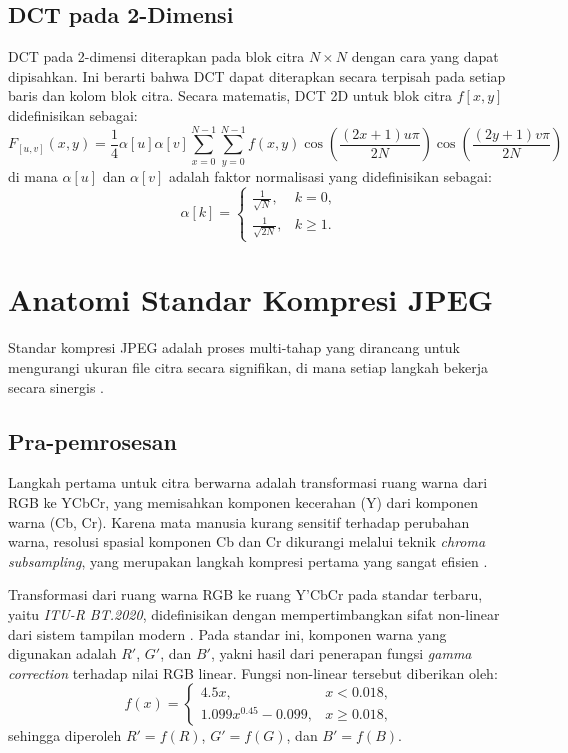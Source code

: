 \documentclass[a4paper]{article}
\begin{document}
\subsection{DCT pada 2-Dimensi}
DCT pada 2-dimensi diterapkan pada blok citra $N \times N$ dengan cara yang dapat dipisahkan. Ini berarti bahwa DCT dapat diterapkan secara terpisah pada setiap baris dan kolom blok citra. Secara matematis, DCT 2D untuk blok citra $f[x,y]$ didefinisikan sebagai:
\begin{equation} \label{eq:dct_2d}
  F_{[u,v]}(x,y) = \frac{1}{4} \alpha[u] \alpha[v] \sum_{x=0}^{N-1} \sum_{y=0}^{N-1} f(x,y) \cos\left(\frac{(2x+1)u\pi}{2N}\right) \cos\left(\frac{(2y+1)v\pi}{2N}\right)
\end{equation}
di mana $\alpha[u]$ dan $\alpha[v]$ adalah faktor normalisasi yang didefinisikan sebagai:
\begin{equation}
  \alpha[k] =
  \begin{cases}
    \frac{1}{\sqrt{N}},  & k = 0,   \\[4pt]
    \frac{1}{\sqrt{2N}}, & k \ge 1.
  \end{cases}
\end{equation}

\section{Anatomi Standar Kompresi JPEG}
Standar kompresi JPEG adalah proses multi-tahap yang dirancang untuk mengurangi ukuran file citra secara signifikan, di mana setiap langkah bekerja secara sinergis \cite{wallace1991jpeg}.

\subsection{Pra-pemrosesan}
Langkah pertama untuk citra berwarna adalah transformasi ruang warna dari RGB ke YCbCr, yang memisahkan komponen kecerahan (Y) dari komponen warna (Cb, Cr). Karena mata manusia kurang sensitif terhadap perubahan warna, resolusi spasial komponen Cb dan Cr dikurangi melalui teknik \textit{chroma subsampling}, yang merupakan langkah kompresi pertama yang sangat efisien \cite{wallace1991jpeg}.

Transformasi dari ruang warna RGB ke ruang Y'CbCr pada standar terbaru, yaitu \textit{ITU-R BT.2020},
didefinisikan dengan mempertimbangkan sifat non-linear dari sistem tampilan modern \cite{itu2020}.
Pada standar ini, komponen warna yang digunakan adalah $R'$, $G'$, dan $B'$,
yakni hasil dari penerapan fungsi \textit{gamma correction} terhadap nilai RGB linear.
Fungsi non-linear tersebut diberikan oleh:
\begin{equation}
  f(x) =
  \begin{cases}
    4.5x,                  & x < 0.018,   \\[4pt]
    1.099x^{0.45} - 0.099, & x \ge 0.018,
  \end{cases}
\end{equation}
sehingga diperoleh $R' = f(R)$, $G' = f(G)$, dan $B' = f(B)$.
\end{document}
